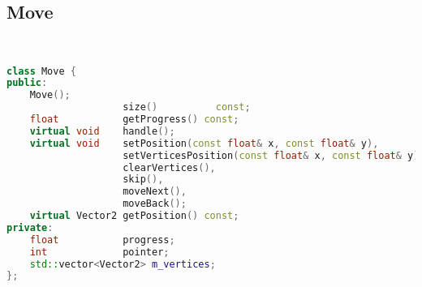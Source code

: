 \subsection{Move}
\begin{lstlisting}[language=C++]


class Move {
public:
    Move();
                    size()          const;
    float           getProgress() const;
    virtual void    handle();
    virtual void    setPosition(const float& x, const float& y),
                    setVerticesPosition(const float& x, const float& y),
                    clearVertices(),
                    skip(),
                    moveNext(),
                    moveBack();
    virtual Vector2 getPosition() const;
private:
    float           progress;
    int             pointer;
    std::vector<Vector2> m_vertices;
};






\end{lstlisting}
